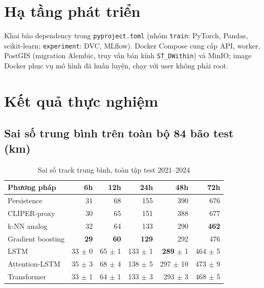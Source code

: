 \documentclass[12pt,a4paper]{article}
\begin{document}
\section{Hạ tầng phát triển}
Khai báo dependency trong \texttt{pyproject.toml} (nhóm \texttt{train}: PyTorch,
Pandas, scikit-learn; \texttt{experiment}: DVC, MLflow). Docker Compose cung cấp
API, worker, PostGIS (migration Alembic, truy vấn bán kính \texttt{ST\_DWithin}) và
MinIO; image Docker phục vụ mô hình đã huấn luyện, chạy với user không phải root.

\section{Kết quả thực nghiệm}
\subsection{Sai số trung bình trên toàn bộ 84 bão test (km)}
\begin{table}[H]\centering
\begin{tabular}{lrrrrr}
\toprule
Phương pháp & 6h & 12h & 24h & 48h & 72h \\
\midrule
Persistence & 31 & 68 & 155 & 390 & 676 \\
CLIPER-proxy & 30 & 65 & 151 & 388 & 677 \\
k-NN analog & 32 & 64 & 133 & 290 & \textbf{462} \\
Gradient boosting & \textbf{29} & \textbf{60} & \textbf{129} & 292 & 476 \\
LSTM & 33 $\pm$ 0 & 65 $\pm$ 1 & 133 $\pm$ 1 & \textbf{289} $\pm$ 1 & 464 $\pm$ 5 \\
Attention-LSTM & 35 $\pm$ 3 & 68 $\pm$ 4 & 138 $\pm$ 5 & 297 $\pm$ 10 & 473 $\pm$ 9 \\
Transformer & 33 $\pm$ 1 & 64 $\pm$ 1 & 133 $\pm$ 3 & 293 $\pm$ 3 & 468 $\pm$ 5 \\
\bottomrule
\end{tabular}
\caption{Sai số track trung bình, toàn tập test 2021--2024}
\end{table}
\end{document}
